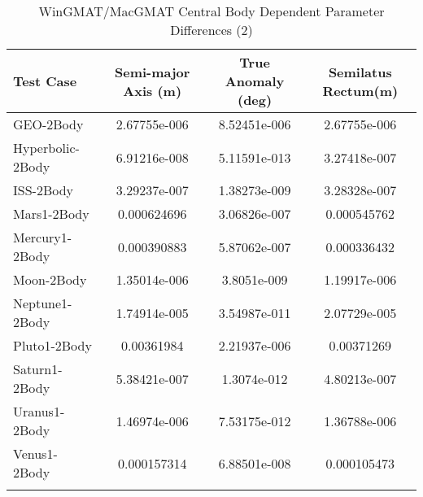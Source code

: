 \begin{table}[htbp!]
\centering
\caption{ WinGMAT/MacGMAT Central Body Dependent Parameter Differences (2)}
      \begin{tabular}{lccc}
      \hline\hline
          Test Case & Semi-major Axis (m) & True Anomaly (deg) & Semilatus Rectum(m) \\
         \hline
         GEO-2Body & 2.67755e-006 & 8.52451e-006 & 2.67755e-006 \\
         Hyperbolic-2Body & 6.91216e-008 & 5.11591e-013 & 3.27418e-007 \\
         ISS-2Body & 3.29237e-007 & 1.38273e-009 & 3.28328e-007 \\
         Mars1-2Body & 0.000624696 & 3.06826e-007 & 0.000545762 \\
         Mercury1-2Body & 0.000390883 & 5.87062e-007 & 0.000336432 \\
         Moon-2Body & 1.35014e-006 & 3.8051e-009 & 1.19917e-006 \\
         Neptune1-2Body & 1.74914e-005 & 3.54987e-011 & 2.07729e-005 \\
         Pluto1-2Body & 0.00361984 & 2.21937e-006 & 0.00371269 \\
         Saturn1-2Body & 5.38421e-007 & 1.3074e-012 & 4.80213e-007 \\
         Uranus1-2Body & 1.46974e-006 & 7.53175e-012 & 1.36788e-006 \\
         Venus1-2Body & 0.000157314 & 6.88501e-008 & 0.000105473 \\
      \hline\hline
      \label{Table: WinGMAT-MacGMAT CB Parameters Set 2} 
\end{tabular}
\end{table}
